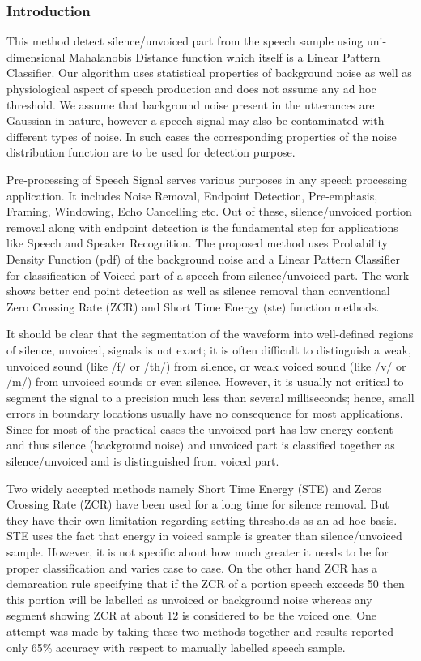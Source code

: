 \documentclass[12pt, a4paper, twoside]{report}
\begin{document}
\subsubsection{Introduction}
This method detect silence/unvoiced part from the speech sample using uni-dimensional Mahalanobis Distance function which itself is a Linear Pattern Classifier. Our algorithm uses statistical properties of background noise as well as physiological aspect of speech production and does not assume any ad hoc threshold. We assume that background noise present in the utterances are Gaussian in nature, however a speech signal may also be contaminated with different types of noise. In such cases the corresponding properties of the noise distribution function are to be used for detection purpose.
\par
Pre-processing of Speech Signal serves various purposes in any speech processing application. It includes Noise Removal, Endpoint Detection, Pre-emphasis, Framing, Windowing, Echo Cancelling etc. Out of these, silence/unvoiced portion removal along with endpoint detection is the fundamental step for applications like Speech and Speaker Recognition. The proposed method uses Probability Density Function (\acrshort{pdf}) of the background noise and a Linear Pattern Classifier for classification of Voiced part of a speech from silence/unvoiced part. The work shows better end point detection as well as silence removal than conventional Zero Crossing Rate (ZCR) and Short Time Energy (\acrshort{ste}) function methods.
\par
It should be clear that the segmentation of the waveform into well-defined regions of silence, unvoiced, signals is not exact; it is often difficult to distinguish a weak, unvoiced sound (like /f/ or /th/) from silence, or weak voiced sound (like /v/ or /m/) from unvoiced sounds or even silence. However, it is usually not critical to segment the signal to a precision much less than several milliseconds; hence, small errors in boundary locations usually have no consequence for most applications. Since for most of the practical cases the unvoiced part has low energy content and thus silence (background noise) and unvoiced part is classified together as silence/unvoiced and is distinguished from voiced part. 
\par
Two widely accepted methods namely Short Time Energy (STE) and Zeros Crossing Rate (ZCR) have been used for a long time for silence removal. But they have their own limitation regarding setting thresholds as an ad-hoc basis. STE uses the fact that energy in voiced sample is greater than silence/unvoiced sample. However, it is not specific about how much greater it needs to be for proper classification and varies case to case. On the other hand ZCR has a demarcation rule specifying that if the ZCR of a portion speech exceeds 50 then this portion will be labelled as unvoiced or background noise whereas any segment showing ZCR at about 12 is considered to be the voiced one. One attempt was made by taking these two methods together and results reported only 65\% accuracy with respect to manually labelled speech sample.
\end{document}
